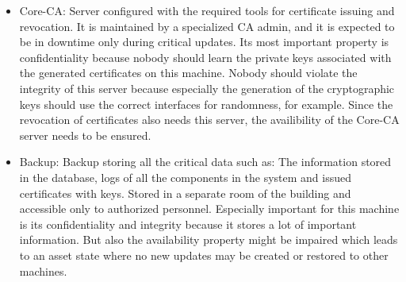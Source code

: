 \documentclass[english]{article}
\begin{document}
\begin{itemize}
      \item Core-CA: Server configured with the required tools for certificate issuing and revocation. It is maintained by a specialized CA admin, and it is expected to be in downtime only during critical updates. Its most important property is confidentiality because nobody should learn the private keys associated with the generated certificates on this machine. Nobody should violate the integrity of this server because especially the generation of the cryptographic keys should use the correct interfaces for randomness, for example. Since the revocation of certificates also needs this server, the availibility of the Core-CA server needs to be ensured.
  \item Backup: Backup storing all the critical data such as: The information stored in the database, logs of all the components in the system and issued certificates with keys. Stored in a separate room of the building and accessible only to authorized personnel. Especially important for this machine is its confidentiality and integrity because it stores a lot of important information. But also the availability property might be impaired which leads to an asset state where no new updates may be created or restored to other machines.
	\end{itemize}
\end{document}
